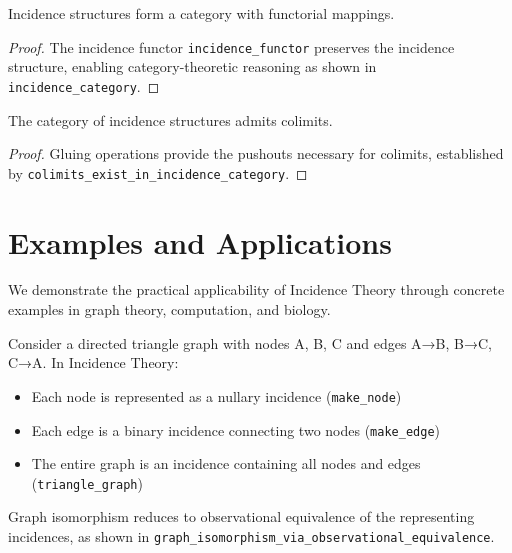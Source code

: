 \documentclass{article}
\begin{document}
\begin{theorem}
\label{thm:incidence-category}
Incidence structures form a category with functorial mappings.
\end{theorem}

\begin{proof}
The incidence functor \texttt{incidence\_functor} preserves the incidence structure, enabling category-theoretic reasoning as shown in \texttt{incidence\_category}.
\end{proof}

\begin{theorem}
\label{thm:colimits}
The category of incidence structures admits colimits.
\end{theorem}

\begin{proof}
Gluing operations provide the pushouts necessary for colimits, established by \texttt{colimits\_exist\_in\_incidence\_category}.
\end{proof}

\section{Examples and Applications}

We demonstrate the practical applicability of Incidence Theory through concrete examples in graph theory, computation, and biology.

\begin{example}
\label{ex:graph-theory}
Consider a directed triangle graph with nodes A, B, C and edges A→B, B→C, C→A. In Incidence Theory:

\begin{itemize}
\item Each node is represented as a nullary incidence (\texttt{make\_node})
\item Each edge is a binary incidence connecting two nodes (\texttt{make\_edge})
\item The entire graph is an incidence containing all nodes and edges (\texttt{triangle\_graph})
\end{itemize}

Graph isomorphism reduces to observational equivalence of the representing incidences, as shown in \texttt{graph\_isomorphism\_via\_observational\_equivalence}.
\end{example}
\end{document}
